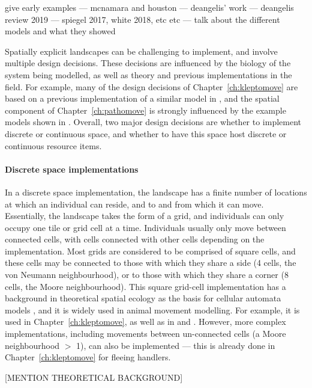 give early examples --- mcnamara and houston --- deangelis' work --- deangelis review 2019 --- spiegel 2017, white 2018, etc etc --- talk about the different models and what they showed

Spatially explicit landscapes can be challenging to implement, and involve multiple design decisions.
These decisions are influenced by the biology of the system being modelled, as well as theory and previous implementations in the field.
For example, many of the design decisions of Chapter~\ref{ch:kleptomove} are based on a previous implementation of a similar model in \citet{netz2021a}, and the spatial component of Chapter~\ref{ch:pathomove} is strongly influenced by the example models shown in \citet{spiegel2017}.
Overall, two major design decisions are whether to implement discrete or continuous space, and whether to have this space host discrete or continuous resource items.

\paragraph*{Discrete space implementations}

In a discrete space implementation, the landscape has a finite number of locations at which an individual can reside, and to and from which it can move.
Essentially, the landscape takes the form of a grid, and individuals can only occupy one tile or grid cell at a time.
Individuals usually only move between connected cells, with cells connected with other cells depending on the implementation.
Most grids are considered to be comprised of square cells, and these cells may be connected to those with which they share a side (4 cells, the von Neumann neighbourhood), or to those with which they share a corner (8 cells, the Moore neighbourhood).
This square grid-cell implementation has a background in theoretical spatial ecology as the basis for cellular automata models \citep[even those concerned with animals][]{jeltschf.1997}, and it is widely used in animal movement modelling.
For example, it is used in Chapter~\ref{ch:kleptomove}, as well as in \citet{white2018,dinuzzo2020,scherer2020} and \citet{netz2021a}.
However, more complex implementations, including movements between un-connected cells (a Moore neighbourhood $>$ 1), can also be implemented --- this is already done in Chapter~\ref{ch:kleptomove} for fleeing handlers.

[MENTION THEORETICAL BACKGROUND]

